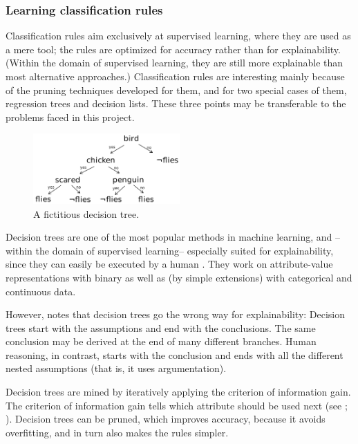 \subsubsection{Learning classification rules}

Classification rules aim exclusively at supervised learning, where they are used as a mere tool; the rules are optimized for accuracy rather than for explainability. (Within the domain of supervised learning, they are still more explainable than most alternative approaches.) Classification rules are interesting mainly because of the pruning techniques developed for them, and for two special cases of them, regression trees and decision lists. These three points may be transferable to the problems faced in this project. 

\label{sec:decision-trees}

\begin{figure}[htb]
        \centering
        \includegraphics[width=0.5\textwidth]{images/decision-tree.png}
        \caption{A fictitious decision tree.}
        \label{fig:decision-tree}
\end{figure}

Decision trees are one of the most popular methods in machine learning, and --within the domain of supervised learning-- especially suited for explainability, since they can easily be executed by a human \cite[ch.~18.3]{russellArtificialIntelligenceModern2010}. They work on attribute-value representations with binary as well as (by simple extensions) with categorical and continuous data.

However, \citet{breidenbachTextCode2021} notes that decision trees go the wrong way for explainability: Decision trees start with the assumptions and end with the conclusions. The same conclusion may be derived at the end of many different branches. Human reasoning, in contrast, starts with the conclusion and ends with all the different nested assumptions (that is, it uses argumentation). 

Decision trees are mined by iteratively applying the criterion of information gain. The criterion of information gain tells which attribute should be used next (see \citet[ch.~18.3]{russellArtificialIntelligenceModern2010}; \citet[ch.~4.3]{wittenDataMiningPractical2017}). Decision trees can be pruned, which improves accuracy, because it avoids overfitting, and in turn also makes the rules simpler. 

